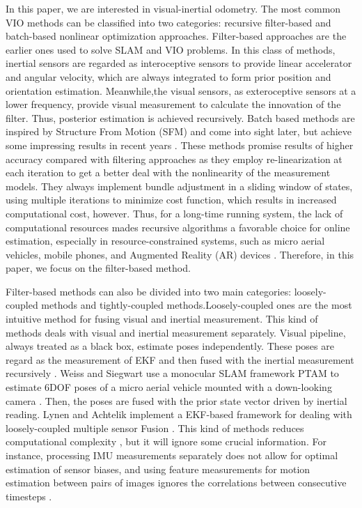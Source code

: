 \documentclass[a4paper, 10pt, conference]{ieeeconf}      %
\begin{document}
In this paper, we are interested in visual-inertial odometry. The most common VIO methods can be classified into two categories: recursive filter-based and batch-based nonlinear optimization approaches. Filter-based approaches are the earlier ones used to solve SLAM and VIO problems. In this class of methods, inertial sensors are regarded as interoceptive sensors to provide linear accelerator and angular velocity, which are always integrated to form prior position and orientation estimation. Meanwhile,the visual sensors, as  exteroceptive sensors at a lower frequency,  provide visual measurement to calculate the innovation of the filter. Thus, posterior estimation is achieved recursively. Batch based methods are inspired by Structure From Motion (SFM) \cite{triggs1999bundle} and come into sight later, but achieve some impressing results in recent years \cite{leutenegger2015keyframe} \cite{strasdat2010scale}  \cite{mur2015orb}. These methods promise results of higher accuracy compared with filtering approaches as they employ re-linearization at each iteration to get a better deal with the nonlinearity of the measurement models. They always implement bundle adjustment in a sliding window of states, using multiple iterations to minimize cost function, which results in increased computational cost, however. Thus, for a long-time running system,  the lack of computational resources mades recursive algorithms a favorable choice for online estimation, especially in resource-constrained systems, such as micro aerial vehicles, mobile phones, and Augmented Reality (AR) devices \cite{li2014visual}. Therefore, in this paper, we focus on the filter-based method.

Filter-based methods can also be divided into two main categories: loosely-coupled methods and tightly-coupled methods.Loosely-coupled ones are the most intuitive method for fusing visual and inertial measurement. This kind of methods deals with visual and inertial  measurement separately. Visual pipeline, always treated as a black box, estimate poses independently. These poses are regard as the measurement of EKF and then fused with the inertial measurement recursively \cite{kleinert2010inertial}. Weiss and Siegwart use a monocular  SLAM framework PTAM to estimate 6DOF poses of a micro aerial vehicle mounted with a down-looking camera  \cite{weiss2011real}. Then, the poses are fused with the prior state vector driven by inertial reading. Lynen and Achtelik implement a EKF-based framework  for dealing  with loosely-coupled multiple sensor Fusion \cite{lynen13robust}. This kind of methods reduces computational complexity , but it will ignore some crucial information. For instance, processing IMU measurements separately does not allow for optimal estimation of sensor biases, and using feature measurements for motion estimation between pairs of images ignores the correlations between consecutive timesteps \cite{mourikis2007multi}.
\end{document}
